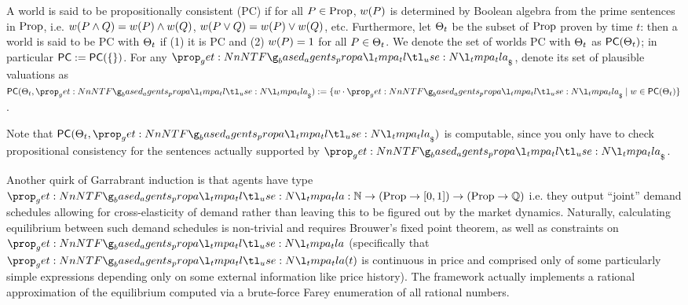 \documentclass{article}
\begin{document}
\begin{definition}[PC worlds]
     A world is said to be propositionally consistent (PC) if for all $P\in\operatorname{Prop}$, $w(P)$ is determined by Boolean algebra from the prime sentences in $\operatorname{Prop}$, i.e. $w(P\land Q)=w(P)\land w(Q)$, $w(P\lor Q)=w(P)\lor w(Q)$, etc. Furthermore, let $\Theta_t$ be the subset of $\operatorname{Prop}$ proven by time $t$: then a world is said to be PC with $\Theta_t$ if (1) it is PC and (2) $w(P)=1$ for all $P\in\Theta_t$. We denote the set of worlds PC with $\Theta_t$ as $\mathsf{PC}(\Theta_t)$; in particular $\mathsf{PC}:=\mathsf{PC}(\{\})$. For any $\inventory$, denote its set of plausible valuations as $\PC(\thms_t,\inventory):=\{\world\cdot\inventory\mid \world\in\PC(\thms_t)\}$.
\end{definition}

Note that $\PC(\thms_t,\inventory)$ is computable, since you only have to check propositional consistency for the sentences actually supported by $\inventory$. 


Another quirk of Garrabrant induction is that agents have type $\agent:\Nats\to(\Props\to\probs)\to(\Props\to\Rats)$ i.e. they output ``joint'' demand schedules allowing for cross-elasticity of demand rather than leaving this to be figured out by the market dynamics. Naturally, calculating equilibrium between such demand schedules is non-trivial and requires Brouwer's fixed point theorem, as well as constraints on $\agent$ (specifically that $\agent(t)$ is continuous in price and comprised only of some particularly simple expressions depending only on some external information like price history). The framework actually implements a rational approximation of the equilibrium computed via a brute-force Farey enumeration of all rational numbers.
\end{document}
